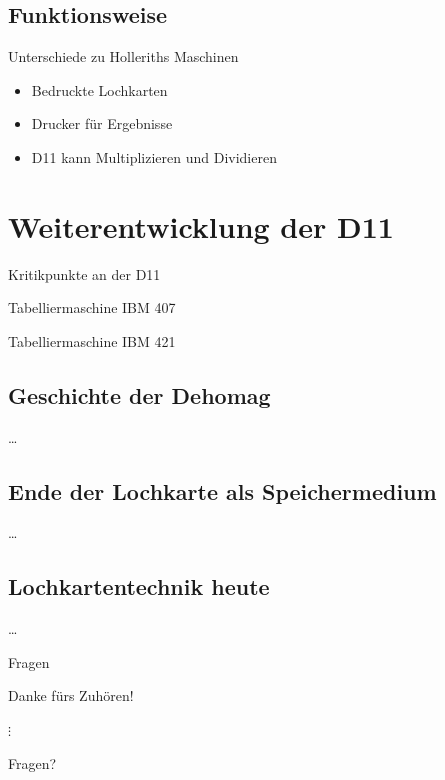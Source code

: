 \documentclass[EU2]{beamer}
\begin{document}
\subsection{Funktionsweise}

\begin{frame}{Unterschiede zu Holleriths Maschinen}
  \begin{itemize}
    \item Bedruckte Lochkarten
    \item Drucker für Ergebnisse
    \item D11 kann Multiplizieren und Dividieren
  \end{itemize}
\end{frame}

\section{Weiterentwicklung der D11}

\begin{frame}{Kritikpunkte an der D11}
\end{frame}

\begin{frame}{Tabelliermaschine IBM 407}
\end{frame}

\begin{frame}{Tabelliermaschine IBM 421}
\end{frame}

\subsection{Geschichte der Dehomag}
\begin{frame}{…}
\end{frame}

\subsection{Ende der Lochkarte als Speichermedium}
\begin{frame}{…}
\end{frame}

\subsection{Lochkartentechnik heute}
\begin{frame}{…}
\end{frame}

\begin{frame}{Fragen}
  \begin{center}
    \Large{Danke fürs Zuhören!}
  \end{center}
  \begin{center}
    $\vdots$
  \end{center}
  \begin{center}
    \Large{Fragen?}
  \end{center}
\end{frame}
\end{document}
